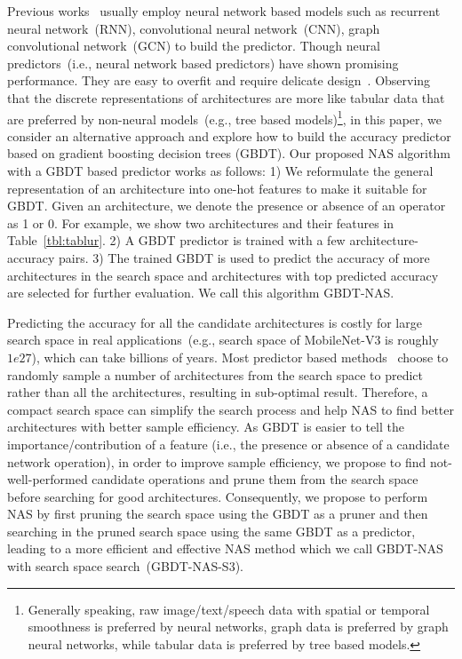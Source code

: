 \documentclass{article}
\begin{document}
Previous works~\cite{perfpred,PNAS,nao,neuralpredictor} usually employ neural network based models such as recurrent neural network~(RNN), convolutional neural network~(CNN), graph convolutional network~(GCN) to build the predictor. Though neural predictors~(i.e., neural network based predictors) have shown promising performance. They are easy to overfit and require delicate design~\cite{nao,neuralpredictor,npenas}. Observing that the discrete representations of architectures are more like tabular data that are preferred by non-neural models~(e.g., tree based models)\footnote{Generally speaking, raw image/text/speech data with spatial or temporal smoothness is preferred by neural networks, graph data is preferred by graph neural networks, while tabular data is preferred by tree based models.},
in this paper, we consider an alternative approach and explore how to build the accuracy predictor based on gradient boosting decision trees (GBDT). Our proposed NAS algorithm with a GBDT based predictor works as follows: 1) We reformulate the general representation of an architecture into one-hot features to make it suitable for GBDT. Given an architecture, we denote the presence or absence of an operator as 1 or 0. For example, we show two architectures and their features in Table~\ref{tbl:tablur}. 2) A GBDT predictor is trained with a few architecture-accuracy pairs. 3) The trained GBDT is used to predict the accuracy of more architectures in the search space and architectures with top predicted accuracy are selected for further evaluation. We call this algorithm GBDT-NAS.

Predicting the accuracy for all the candidate architectures is costly for large search space in real applications~(e.g., search space of MobileNet-V3 is roughly $1e27$), which can take billions of years. Most predictor based methods~\cite{neuralpredictor} choose to randomly sample a number of architectures from the search space to predict rather than all the architectures, resulting in sub-optimal result. Therefore, a compact search space can simplify the search process and help NAS to find better architectures with better sample efficiency. As GBDT is easier to tell the importance/contribution of a feature (i.e., the presence or absence of a candidate network operation), in order to improve sample efficiency, we propose to find not-well-performed candidate operations and prune them from the search space before searching for good architectures. Consequently, we propose to perform NAS by first pruning the search space using the GBDT as a pruner and then searching in the pruned search space using the same GBDT as a predictor, leading to a more efficient and effective NAS method which we call GBDT-NAS with search space search~(GBDT-NAS-S3).
\end{document}
